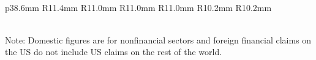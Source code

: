 \begin{minipage}{0.76\textwidth}
\vspace{2mm}
\\
\vspace*{-4mm}

{\footnotesize {} \setlength{\tabcolsep}{3.5pt} \color{black!90}
{\renewcommand{\arraystretch}{1.65}
\hspace{0.5mm}\begin{tabular}{p{38.6mm} R{11.4mm} R{11.0mm} R{11.0mm} R{11.0mm} R{10.2mm} R{10.2mm}}
		 \hline
	\end{tabular}}}\vspace{-1.5mm}

\\
\footnotesize{Note: Domestic figures are for nonfinancial sectors and foreign financial claims on the US do not include US claims on the rest of the world.}
\end{minipage}
\newpage
